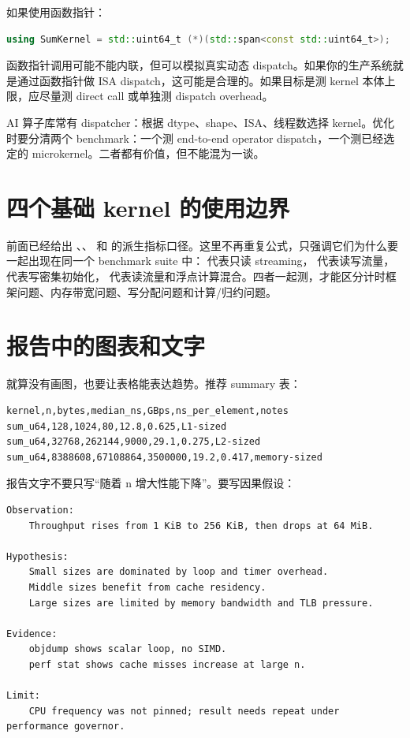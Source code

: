 如果使用函数指针：

\begin{lstlisting}[language=C++]
using SumKernel = std::uint64_t (*)(std::span<const std::uint64_t>);
\end{lstlisting}

函数指针调用可能不能内联，但可以模拟真实动态 dispatch。如果你的生产系统就是通过函数指针做 ISA dispatch，这可能是合理的。如果目标是测 kernel 本体上限，应尽量测 direct call 或单独测 dispatch overhead。

\begin{deepdive}
AI 算子库常有 dispatcher：根据 dtype、shape、ISA、线程数选择 kernel。优化时要分清两个 benchmark：一个测 end-to-end operator dispatch，一个测已经选定的 microkernel。二者都有价值，但不能混为一谈。
\end{deepdive}

\section{四个基础 kernel 的使用边界}

前面已经给出 、、 和  的派生指标口径。这里不再重复公式，只强调它们为什么要一起出现在同一个 benchmark suite 中： 代表只读 streaming， 代表读写流量， 代表写密集初始化， 代表读流量和浮点计算混合。四者一起测，才能区分计时框架问题、内存带宽问题、写分配问题和计算/归约问题。

\section{报告中的图表和文字}

就算没有画图，也要让表格能表达趋势。推荐 summary 表：

\begin{lstlisting}
kernel,n,bytes,median_ns,GBps,ns_per_element,notes
sum_u64,128,1024,80,12.8,0.625,L1-sized
sum_u64,32768,262144,9000,29.1,0.275,L2-sized
sum_u64,8388608,67108864,3500000,19.2,0.417,memory-sized
\end{lstlisting}

报告文字不要只写“随着 n 增大性能下降”。要写因果假设：

\begin{lstlisting}
Observation:
    Throughput rises from 1 KiB to 256 KiB, then drops at 64 MiB.

Hypothesis:
    Small sizes are dominated by loop and timer overhead.
    Middle sizes benefit from cache residency.
    Large sizes are limited by memory bandwidth and TLB pressure.

Evidence:
    objdump shows scalar loop, no SIMD.
    perf stat shows cache misses increase at large n.

Limit:
    CPU frequency was not pinned; result needs repeat under performance governor.
\end{lstlisting}

